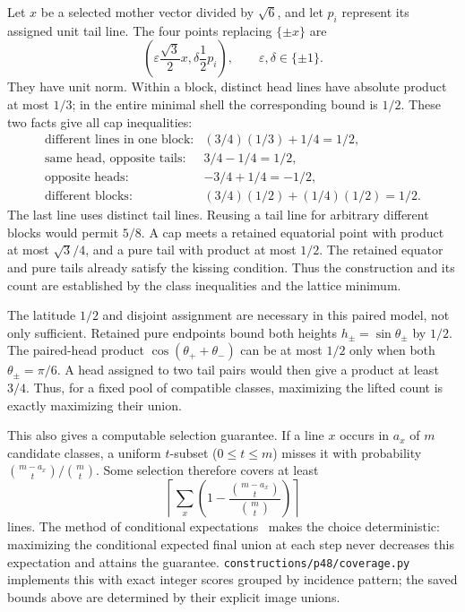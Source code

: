Let $x$ be a selected mother vector divided by $\sqrt6$, and let $p_i$
represent its assigned unit tail line. The four points replacing
$\{\pm x\}$ are
\[
 \left(\varepsilon\frac{\sqrt3}{2}x,
       \delta\frac12p_i\right),\qquad \varepsilon,\delta\in\{\pm1\}.
\]
They have unit norm. Within a block, distinct head lines have absolute
product at most $1/3$; in the entire minimal shell the corresponding
bound is $1/2$. These two facts give all cap inequalities:
\[
\begin{array}{ll}
\text{different lines in one block:}&(3/4)(1/3)+1/4=1/2,\\
\text{same head, opposite tails:}&3/4-1/4=1/2,\\
\text{opposite heads:}&-3/4+1/4=-1/2,\\
\text{different blocks:}&(3/4)(1/2)+(1/4)(1/2)=1/2.
\end{array}
\]
The last line uses distinct tail lines. Reusing a tail line for arbitrary
different blocks would permit $5/8$. A cap meets a retained equatorial
point with product at most $\sqrt3/4$, and a pure tail with product at
most $1/2$. The retained equator and pure tails already satisfy the
kissing condition. Thus the construction and its count are established
by the class inequalities and the lattice minimum.

The latitude $1/2$ and disjoint assignment are necessary in this paired
model, not only sufficient. Retained pure endpoints bound both heights
$h_\pm=\sin\theta_\pm$ by $1/2$. The paired-head product
$\cos(\theta_++\theta_-)$ can be at most $1/2$ only when both
$\theta_\pm=\pi/6$. A head assigned to two tail pairs would then
give a product at least $3/4$. Thus, for a fixed pool of compatible
classes, maximizing the lifted count is exactly maximizing their union.

This also gives a computable selection guarantee. If a line $x$ occurs
in $a_x$ of $m$ candidate classes, a uniform $t$-subset ($0\le t\le m$) misses it with
probability $\binom{m-a_x}{t}/\binom mt$. Some selection therefore covers at least
\[
\left\lceil\sum_x\left(1-\frac{\binom{m-a_x}{t}}{\binom mt}\right)\right\rceil
\]
lines. The method of conditional expectations~\cite{raghavan1988} makes
the choice deterministic: maximizing the conditional expected final union
at each step never decreases this expectation and attains the guarantee.
\texttt{constructions/p48/coverage.py} implements this with exact
integer scores grouped by incidence pattern; the saved bounds above
are determined by their explicit image unions.


